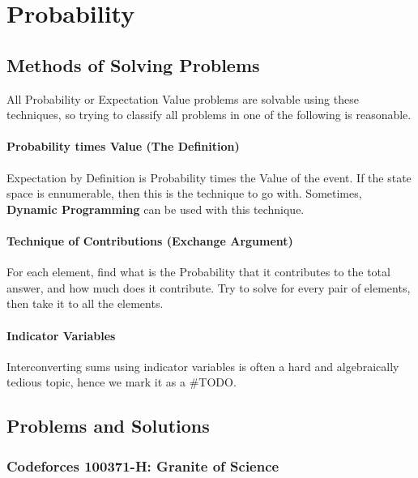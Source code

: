 \chapter{Probability}



\section{Methods of Solving Problems}

All Probability or Expectation Value problems are solvable using these techniques, so trying to classify all problems in one of the following is reasonable.

\subsubsection{Probability times Value (The Definition)}

Expectation by Definition is Probability times the Value of the event. If the state space is ennumerable, then this is the technique to go with. Sometimes, \textbf{Dynamic Programming} can be used with this technique.

\subsubsection{Technique of Contributions (Exchange Argument)}

For each element, find what is the Probability that it contributes to the total answer, and how much does it contribute. Try to solve for every pair of elements, then take it to all the elements.

\subsubsection{Indicator Variables}

Interconverting sums using indicator variables is often a hard and algebraically tedious topic, hence we mark it as a \#TODO.


\section{Problems and Solutions}


\subsection{Codeforces 100371-H: Granite of Science}

